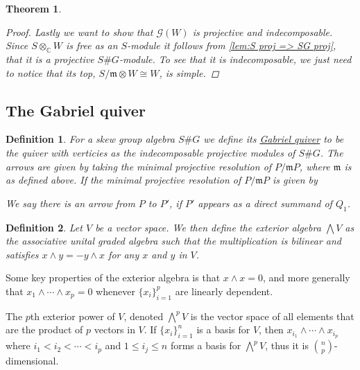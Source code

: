 \documentclass[11pt, a4paper, english]{article}
\numberwithin{prop}{section}
\numberwithin{lemma}{section}
\newtheorem{theorem}{Theorem}
\numberwithin{theorem}{section}
\newtheorem{defin}{Definition}
\numberwithin{defin}{section}
\numberwithin{example}{section}
\newcommand{\C}{\mathbb{C}}
\begin{document}
\begin{theorem}
\begin{proof}
Lastly we want to show that $\mathcal{G}(W)$ is projective and indecomposable. Since $S \otimes_\C W$ is free as an $S$-module it follows from \cref{lem:S proj => SG proj}, that it is a projective $S\#G$-module. To see that it is indecomposable, we just need to notice that its top, $S/\mathfrak{m} \otimes W \cong W$, is simple.
\end{proof}
\fi

\end{theorem}

\subsection{The Gabriel quiver}

\begin{defin}
For a skew group algebra $S\#G$ we define its \underline{Gabriel quiver} to be the quiver with verticies as the indecomposable projective modules of $S\#G$. The arrows are given by taking the minimal projective resolution of $P/\mathfrak{m}P$, where $\mathfrak{m}$ is as defined above. If the minimal projective resolution of $P/\mathfrak{m}P$ is given by
\begin{center}
\end{center}
We say there is an arrow from $P$ to $P'$, if $P'$ appears as a direct summand of $Q_1$.
\end{defin}

\begin{defin}
Let $V$ be a vector space. We then define the exterior algebra $\bigwedge V$ as the associative unital graded algebra such that the multiplication is bilinear and satisfies $x \wedge y = -y \wedge x$ for any $x$ and $y$ in $V$. 
\end{defin}
Some key properties of the exterior algebra is that $x \wedge x = 0$, and more generally that $x_1 \wedge \cdots \wedge x_p = 0$ whenever $\{x_i\}_{i=1}^p$ are linearly dependent.

The $p$th exterior power of $V$, denoted $\bigwedge\limits^p V$ is the vector space of all elements that are the product of $p$ vectors in $V$. If $\{ x_i \}_{i=1}^n$ is a basis for $V$, then $x_{i_1} \wedge \cdots \wedge x_{i_p}$ where $i_1 < i_2 < \cdots < i_p$ and $1 \leq i_j \leq n$ forms a basis for $\bigwedge\limits^p V$, thus it is ${n \choose p}$-dimensional.  
\end{document}
